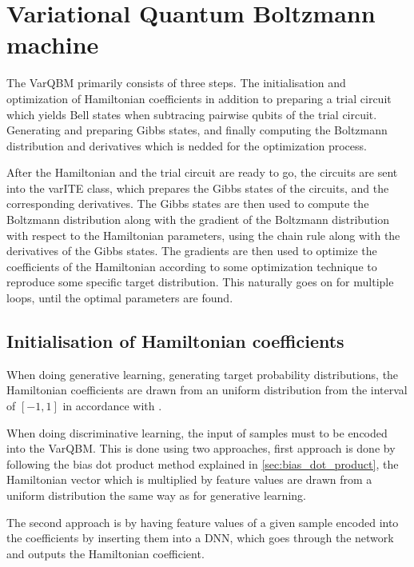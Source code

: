 \documentclass[../main.tex]{subfiles}
\begin{document}
\section{Variational Quantum Boltzmann machine}
The VarQBM primarily consists of three steps. The initialisation and optimization of Hamiltonian coefficients in addition to preparing a trial circuit which yields Bell states when subtracing pairwise qubits of the trial circuit. Generating and preparing Gibbs states, and finally computing the Boltzmann distribution and derivatives which is nedded for the optimization process.

After the Hamiltonian and the trial circuit are ready to go, the circuits are sent into the varITE class, which prepares the Gibbs states of the circuits, and the corresponding derivatives. The Gibbs states are then used to compute the Boltzmann distribution along with the gradient of the Boltzmann distribution with respect to the Hamiltonian parameters, using the chain rule along with the derivatives of the Gibbs states. The gradients are then used to optimize the coefficients of the Hamiltonian according to some optimization technique to reproduce some specific target distribution. This naturally goes on for multiple loops, until the optimal parameters are found.

\subsection{Initialisation of Hamiltonian coefficients}
When doing generative learning, generating target probability distributions, the Hamiltonian coefficients are drawn from an uniform distribution from the interval of $[-1, 1]$ in accordance with \cite{VQB:litteraturelist}.

When doing discriminative learning, the input of samples must to be encoded into the VarQBM. This is done using two approaches, first approach is done by following the bias dot product method explained in \autoref{sec:bias_dot_product}, the Hamiltonian vector which is multiplied by feature values are drawn from a uniform distribution the same way as for generative learning.

The second approach is by having feature values of a given sample encoded into the coefficients by inserting them into a DNN, which goes through the network and outputs the Hamiltonian coefficient. 
\end{document}
